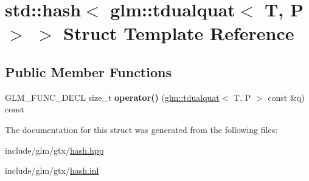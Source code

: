 \hypertarget{structstd_1_1hash_3_01glm_1_1tdualquat_3_01T_00_01P_01_4_01_4}{}\section{std\+:\+:hash$<$ glm\+:\+:tdualquat$<$ T, P $>$ $>$ Struct Template Reference}
\label{structstd_1_1hash_3_01glm_1_1tdualquat_3_01T_00_01P_01_4_01_4}
\subsection*{Public Member Functions}
\begin{DoxyCompactItemize}
\item 
\mbox{\label{structstd_1_1hash_3_01glm_1_1tdualquat_3_01T_00_01P_01_4_01_4_a7aa5ad5faca55261a8502ad2ff1d77fe}} 
G\+L\+M\+\_\+\+F\+U\+N\+C\+\_\+\+D\+E\+CL size\+\_\+t {\bfseries operator()} (\hyperlink{structglm_1_1tdualquat}{glm\+::tdualquat}$<$ T, P $>$ const \&q) const
\end{DoxyCompactItemize}


The documentation for this struct was generated from the following files\+:\begin{DoxyCompactItemize}
\item 
include/glm/gtx/\hyperlink{hash_8hpp}{hash.\+hpp}\item 
include/glm/gtx/\hyperlink{hash_8inl}{hash.\+inl}\end{DoxyCompactItemize}
